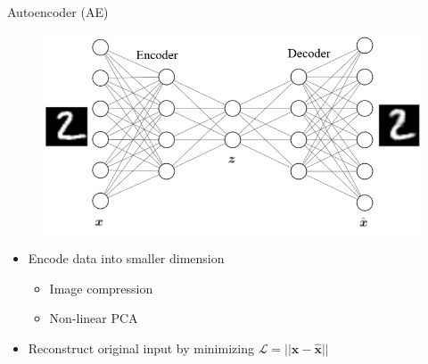 \documentclass{beamer}
\newcommand{\vect}[1]{\boldsymbol{#1}}
\theoremstyle{definition}
\begin{document}
\begin{frame}{Autoencoder (AE)}
  \begin{figure}
    \includegraphics[width=.8\textwidth]{../img/ae_visual.png}
  \end{figure}
\begin{itemize}
  \item Encode data into smaller dimension
    \begin{itemize}
      \item Image compression
      \item Non-linear PCA
    \end{itemize}
  \item Reconstruct original input by minimizing $\mathcal{L} = ||\vect x - \hat{\vect x}||$
\end{itemize}
\end{frame}
\end{document}
